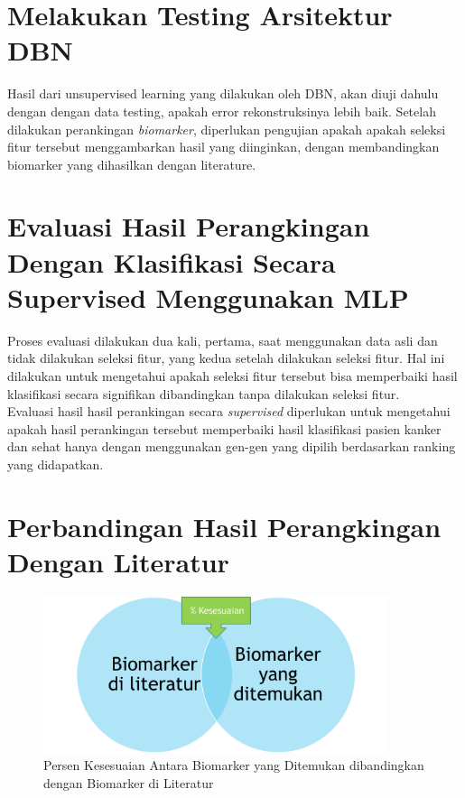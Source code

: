 \section{Melakukan Testing Arsitektur DBN}
Hasil dari unsupervised learning yang dilakukan oleh DBN, akan diuji dahulu dengan dengan data testing, apakah error rekonstruksinya lebih baik. Setelah dilakukan perankingan \textit{biomarker}, diperlukan pengujian apakah apakah seleksi fitur tersebut menggambarkan hasil yang diinginkan, dengan membandingkan biomarker yang dihasilkan dengan literature. 



\section{Evaluasi Hasil Perangkingan Dengan Klasifikasi Secara Supervised Menggunakan MLP}

Proses evaluasi dilakukan dua kali, pertama, saat menggunakan data asli dan tidak dilakukan seleksi fitur, yang kedua setelah dilakukan seleksi fitur. Hal ini dilakukan untuk mengetahui apakah seleksi fitur tersebut bisa memperbaiki hasil klasifikasi secara signifikan dibandingkan tanpa dilakukan seleksi fitur. \\
Evaluasi hasil hasil perankingan secara \textit{supervised} diperlukan untuk mengetahui apakah hasil perankingan tersebut memperbaiki hasil klasifikasi pasien kanker dan sehat hanya dengan menggunakan gen-gen yang dipilih berdasarkan ranking yang didapatkan.


\section{Perbandingan Hasil Perangkingan Dengan Literatur}
\begin{figure}
	\centering
	\includegraphics[width=0.9\textwidth]
		{pics/biomarker1.png}
	\caption{Persen Kesesuaian Antara Biomarker yang Ditemukan dibandingkan dengan Biomarker di Literatur}
	\label{fig:biomarker1}
\end{figure}

